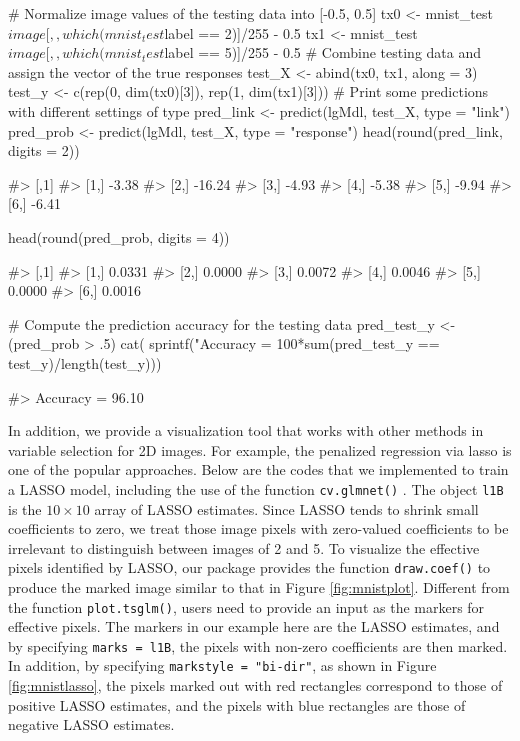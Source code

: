 \begin{Schunk}
\begin{Sinput}
# Normalize image values of the testing data into [-0.5, 0.5]
tx0 <- mnist_test$image[,,which(mnist_test$label == 2)]/255 - 0.5
tx1 <- mnist_test$image[,,which(mnist_test$label == 5)]/255 - 0.5
# Combine testing data and assign the vector of the true responses
test_X <- abind(tx0, tx1, along = 3)
test_y <- c(rep(0, dim(tx0)[3]), rep(1, dim(tx1)[3]))
# Print some predictions with different settings of type
pred_link <- predict(lgMdl, test_X, type = "link")
pred_prob <- predict(lgMdl, test_X, type = "response")
head(round(pred_link, digits = 2))
\end{Sinput}
\begin{Soutput}
#>        [,1]
#> [1,]  -3.38
#> [2,] -16.24
#> [3,]  -4.93
#> [4,]  -5.38
#> [5,]  -9.94
#> [6,]  -6.41
\end{Soutput}
\begin{Sinput}
head(round(pred_prob, digits = 4))
\end{Sinput}
\begin{Soutput}
#>        [,1]
#> [1,] 0.0331
#> [2,] 0.0000
#> [3,] 0.0072
#> [4,] 0.0046
#> [5,] 0.0000
#> [6,] 0.0016
\end{Soutput}
\begin{Sinput}
# Compute the prediction accuracy for the testing data
pred_test_y <- (pred_prob > .5)
cat(
  sprintf("Accuracy = %
          100*sum(pred_test_y == test_y)/length(test_y)))
\end{Sinput}
\begin{Soutput}
#> Accuracy = 96.10%
\end{Soutput}
\end{Schunk}

In addition, we provide a visualization tool that works with other
methods in variable selection for 2D images. For example, the penalized
regression via lasso \citep{tibshirani1996regression} is one of the
popular approaches. Below are the codes that we implemented to train a
LASSO model, including the use of the function \texttt{cv.glmnet()}
\citep{friedman2010regularization}. The object \texttt{l1B} is the
\(10\times10\) array of LASSO estimates. Since LASSO tends to shrink
small coefficients to zero, we treat those image pixels with zero-valued
coefficients to be irrelevant to distinguish between images of 2 and 5.
To visualize the effective pixels identified by LASSO, our package
 provides the function \texttt{draw.coef()} to
produce the marked image similar to that in Figure \ref{fig:mnistplot}.
Different from the function \texttt{plot.tsglm()}, users need to provide
an input as the markers for effective pixels. The markers in our example
here are the LASSO estimates, and by specifying \texttt{marks\ =\ l1B},
the pixels with non-zero coefficients are then marked. In addition, by
specifying \texttt{markstyle\ =\ "bi-dir"}, as shown in Figure
\ref{fig:mnistlasso}, the pixels marked out with red rectangles
correspond to those of positive LASSO estimates, and the pixels with
blue rectangles are those of negative LASSO estimates.

